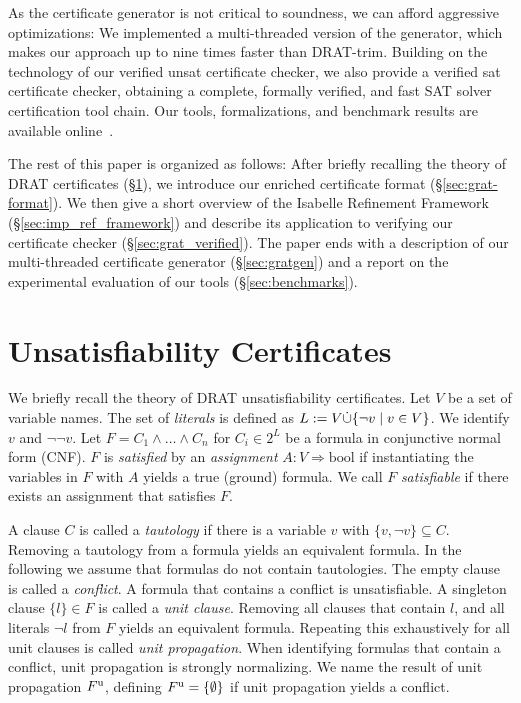 \documentclass{llncs}
\begin{document}
As the certificate generator is not critical to soundness, we can afford aggressive optimizations:
We implemented a multi-threaded version of the generator, which makes our approach up to nine times faster than DRAT-trim.
Building on the technology of our verified unsat certificate checker, we also provide a verified sat certificate checker, 
obtaining a complete, formally verified, and fast SAT solver certification tool chain. 
Our tools, formalizations, and benchmark results are available online~\cite{GRAT-homepage}.

The rest of this paper is organized as follows: 
After briefly recalling the theory of DRAT certificates (\S\ref{sec:unsat_cert}), we introduce our enriched certificate format (\S\ref{sec:grat-format}).
We then give a short overview of the Isabelle Refinement Framework (\S\ref{sec:imp_ref_framework})
and describe its application to verifying our certificate checker (\S\ref{sec:grat_verified}). 
The paper ends with a description of our multi-threaded certificate generator (\S\ref{sec:gratgen}) and a report on the experimental evaluation 
of our tools (\S\ref{sec:benchmarks}).

\section{Unsatisfiability Certificates}\label{sec:unsat_cert}
We briefly recall the theory of DRAT unsatisfiability certificates. 
Let $V$ be a set of variable names. The set of \emph{literals} is defined as $L := V \dot{\cup} \{\neg v \mid v\in V \}$.
We identify $v$ and $\neg\neg v$.
Let $F = C_1 \wedge \ldots \wedge C_n$ for $C_i \in 2^L$ be a formula in conjunctive normal form (CNF). 
$F$ is \emph{satisfied} by an \emph{assignment} $A : V \Rightarrow \textrm{bool}$ if instantiating the variables in $F$ with $A$ yields a true (ground) formula.
We call $F$ \emph{satisfiable} if there exists an assignment that satisfies $F$.

A clause $C$ is called a \emph{tautology} if there is a variable $v$ with $\{v,\neg v\} \subseteq C$. Removing a tautology from a formula yields an equivalent formula.
In the following we assume that formulas do not contain tautologies.
The empty clause is called a \emph{conflict}. A formula that contains a conflict is unsatisfiable. 
A singleton clause $\{l\} \in F$ is called a \emph{unit clause}. Removing all clauses that contain $l$, and all literals $\neg l$ from $F$ yields an equivalent formula.
Repeating this exhaustively for all unit clauses is called \emph{unit propagation}. When identifying formulas that contain a conflict, unit propagation is strongly normalizing. 
We name the result of unit propagation $F^{\textrm u}$, defining $F^{\textrm u} = \{\emptyset\}$ if unit propagation yields a conflict.
\end{document}

